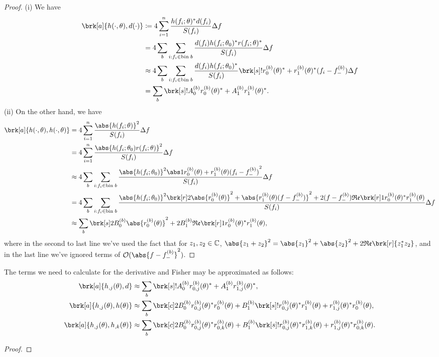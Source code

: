 \begin{proof}
(i) We have
\begin{align*}
\brk[a]{h(\cdot, \theta), d(\cdot)} &\defn 4 \sum_{i=1}^n \frac{h(f_i;\theta)^* d(f_i) }{S(f_i)}\Delta f \\
&= 4 \sum_{b} \sum_{i:f_i \in \text{bin} \; b} \frac{d(f_i) h(f_i;\theta_0)^* r(f_i;\theta)^*}{S(f_i)}\Delta f \\
&\approx 4 \sum_{b} \sum_{i:f_i \in \text{bin} \; b} \frac{d(f_i) h(f_i;\theta_0)^*}{S(f_i)} \brk[s]!{r_0^{(b)}(\theta)^* + r_1^{(b)}(\theta)^*(f_i - f_-^{(b)})} \Delta f\\
&= \sum_b \brk[s]!{A_0^{(b)} r_0^{(b)}(\theta)^* + A_1^{(b)} r_1^{(b)}(\theta)^*}.
\end{align*}
(ii) On the other hand, we have
\begin{align*}
\brk[a]{h(\cdot,\theta), h(\cdot,\theta)} &= 4 \sum_{i=1}^n \frac{\abs{h(f_i;\theta)}^2}{S(f_i)} \Delta f \\
&= 4 \sum_{i=1}^n \frac{\abs{h(f_i;\theta_0)r(f_i;\theta) }^2}{S(f_i)}\Delta f \\
&\approx 4 \sum_b \sum_{i:f_i \in \text{bin} \; b} \frac{\abs{h(f_i;\theta_0)}^2 \abs1{r_0^{(b)}(\theta) + r_1^{(b)}(\theta) (f_i-f_-^{(b)})}^2}{S(f_i)}\Delta f \\
&= 4 \sum_b \sum_{i:f_i \in \text{bin} \; b}\frac{\abs{h(f_i;\theta_0)}^2 \brk[r]2{\abs{r_0^{(b)}(\theta)}^2 + \abs{r_1^{(b)}(\theta)(f-f_-^{(b)})}^2 + 2(f-f_-^{(b)}) \re \brk[r]1{r_0^{(b)}(\theta)^*r_1^{(b)}(\theta)}}}{S(f_i)}\Delta f \\
&\approx \sum_b \brk[s]2{B_0^{(b)} \abs{r_0^{(b)}(\theta)}^2 + 2B_1^{(b)} \re \brk[r]1{r_0^{(b)}(\theta)^* r_1^{(b)}(\theta)}},
\end{align*}
where in the second to last line we've used the fact that for $z_1, z_2 \in \mathbb{C}$, $\abs{z_1+z_2}^2 = \abs{z_1}^2 + \abs{z_2}^2 + 2 \re \brk[r]{z_1^* z_2}$, and in the last line we've ignored terms of $\order(\abs{f-f_-^{(b)}}^2)$.
\end{proof}

\begin{proposition}[]\label{}
The terms we need to calculate for the derivative and Fisher may be approximated as follows:
\begin{align*}
\brk[a]{h_{,j}(\theta),d} &\approx \sum_b \brk[s]!{A_0^{(b)} r_{0,j}^{(b)} (\theta)^* + A_1^{(b)} r_{1,j}^{(b)}(\theta)^*}, \\
\brk[a]{h_{,j}(\theta), h(\theta)} &\approx \sum_b \brk[c]2{B_0^{(b)} r_{0,j}^{(b)}(\theta)^* r_0^{(b)}(\theta) + B_1^{(b)} \brk[s]!{r_{0,j}^{(b)}(\theta)^* r_1^{(b)}(\theta) + r_{1,j}^{(b)}(\theta)^* r_0^{(b)}(\theta)}}, \\
\brk[a]{h_{,j}(\theta), h_{,k}(\theta)} &\approx \sum_b \brk[c]2{B_0^{(b)} r_{0,j}^{(b)}(\theta)^* r_{0,k}^{(b)}(\theta) + B_1^{(b)} \brk[s]!{r_{0,j}^{(b)}(\theta)^* r_{1,k}^{(b)}(\theta) + r_{1,j}^{(b)}(\theta)^* r_{0,k}^{(b)}(\theta)}}.
\end{align*}
\end{proposition}
\begin{proof}

\end{proof}


